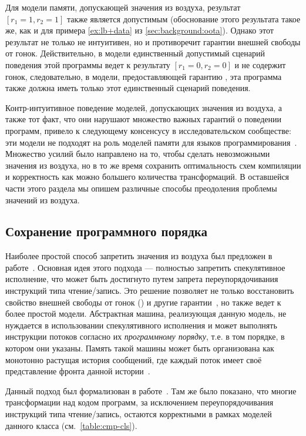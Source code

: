 Для модели памяти, допускающей значения из воздуха, 
результат ${[r_1=1, r_2=1]}$ также является допустимым
(обоснование этого результата такое же, как и для 
примера \ref{ex:lb+data} из \cref{sec:background:oota}).
Однако этот результат не только  не интуитивен, 
но и противоречит гарантии внешней свободы от гонок. 
Действительно, в модели \SC единственный допустимый 
сценарий поведения этой программы ведет к результату $[r_1=0, r_2=0]$ 
и не содержит гонок, следовательно, 
в модели, предоставляющей гарантию \eDRF, 
эта программа также должна иметь только этот единственный сценарий поведения. 

Контр-интуитивное поведение моделей, 
допускающих значения из воздуха, 
а также тот факт, что они нарушают множество 
важных гарантий о поведении программ, 
привело к следующему консенсусу в исследовательском сообществе: 
эти модели не подходят на роль моделей памяти 
для языков программирования~\cite{Boehm-Demsky:MSPC14, Batty-al:ESOP15}.  
Множество усилий было  направлено на то, 
чтобы сделать невозможными значения из воздуха, 
но в то же время сохранить оптимальность схем 
компиляции и корректность как можно большего количества трансформаций. 
В оставшейся части этого раздела мы опишем различные 
способы преодоления  проблемы значений из воздуха. 

\subsection{Сохранение программного порядка}
\label{sec:analysis:porf}

Наиболее простой способ запретить значения из воздуха 
был предложен в работе~\cite{Boehm-Demsky:MSPC14}.
Основная идея этого подхода --- полностью запретить спекулятивное исполнение, 
что может быть достигнуто путем запрета переупорядочивания 
инструкций типа чтение/запись. 
Это решение позволяет не только восстановить 
свойство внешней свободы от гонок (\eDRF) 
и другие гарантии~\cite{Lahav-al:PLDI17}, 
но также ведет к более простой модели. 
Абстрактная машина, реализующая данную модель, 
не нуждается в использовании спекулятивного исполнения
и может выполнять инструкции потоков согласно их
\emph{программному порядку}, т.е. в том порядке, в котором они указаны. 
Память такой машины может быть организована 
как монотонно растущая история сообщений, 
где каждый поток имеет своё представление  
фронта данной истории~\cite{Dolan-al:PLDI18, Doherty-al:PPoPP19}. 

Данный подход был формализован в работе~\cite{Lahav-al:PLDI17}.
Там же было показано, что многие трансформации над кодом программ, за исключением переупорядочивания 
инструкций типа чтение/запись, остаются корректными в рамках 
моделей данного класса (см.~\cref{table:cmp-cls}).

